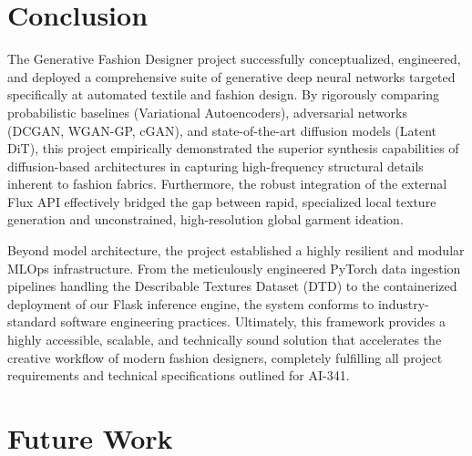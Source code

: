 \documentclass[12pt,a4paper]{article}
\begin{document}
\section{Conclusion}

The Generative Fashion Designer project successfully conceptualized, engineered, and deployed a comprehensive suite of generative deep neural networks targeted specifically at automated textile and fashion design. By rigorously comparing probabilistic baselines (Variational Autoencoders), adversarial networks (DCGAN, WGAN-GP, cGAN), and state-of-the-art diffusion models (Latent DiT), this project empirically demonstrated the superior synthesis capabilities of diffusion-based architectures in capturing high-frequency structural details inherent to fashion fabrics. Furthermore, the robust integration of the external Flux API effectively bridged the gap between rapid, specialized local texture generation and unconstrained, high-resolution global garment ideation.

Beyond model architecture, the project established a highly resilient and modular MLOps infrastructure. From the meticulously engineered PyTorch data ingestion pipelines handling the Describable Textures Dataset (DTD) to the containerized deployment of our Flask inference engine, the system conforms to industry-standard software engineering practices. Ultimately, this framework provides a highly accessible, scalable, and technically sound solution that accelerates the creative workflow of modern fashion designers, completely fulfilling all project requirements and technical specifications outlined for AI-341.

\section{Future Work}
\end{document}
